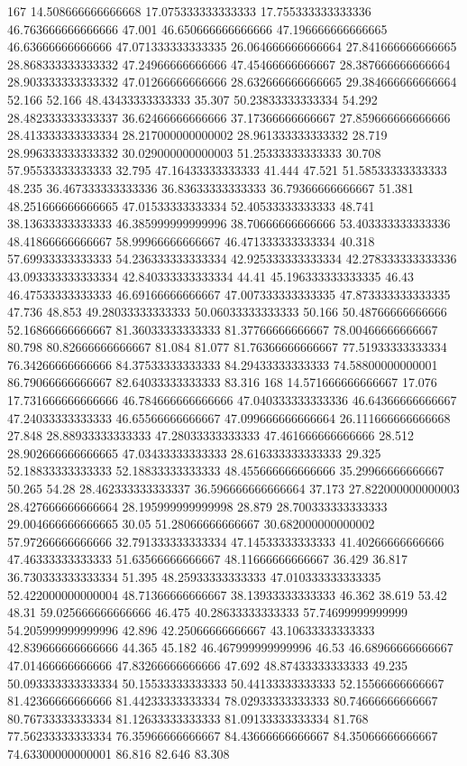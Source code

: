 167 14.508666666666668 17.075333333333333 17.755333333333336 46.763666666666666 47.001 46.650666666666666 47.196666666666665 46.63666666666666 47.071333333333335 26.064666666666664 27.841666666666665 28.868333333333332 47.24966666666666 47.45466666666667 28.387666666666664 28.903333333333332 47.01266666666666 28.632666666666665 29.384666666666664 52.166 52.166 48.43433333333333 35.307 50.23833333333334 54.292 28.482333333333337 36.62466666666666 37.17366666666667 27.859666666666666 28.413333333333334 28.217000000000002 28.961333333333332 28.719 28.996333333333332 30.029000000000003 51.25333333333333 30.708 57.95533333333333 32.795 47.16433333333333 41.444 47.521 51.58533333333333 48.235 36.467333333333336 36.83633333333333 36.79366666666667 51.381 48.251666666666665 47.01533333333334 52.40533333333333 48.741 38.13633333333333 46.385999999999996 38.70666666666666 53.403333333333336 48.41866666666667 58.99966666666667 46.471333333333334 40.318 57.69933333333333 54.236333333333334 42.925333333333334 42.278333333333336 43.093333333333334 42.840333333333334 44.41 45.196333333333335 46.43 46.47533333333333 46.69166666666667 47.007333333333335 47.873333333333335 47.736 48.853 49.28033333333333 50.06033333333333 50.166 50.48766666666666 52.16866666666667 81.36033333333333 81.37766666666667 78.00466666666667 80.798 80.82666666666667 81.084 81.077 81.76366666666667 77.51933333333334 76.34266666666666 84.37533333333333 84.29433333333333 74.58800000000001 86.79066666666667 82.64033333333333 83.316
168 14.571666666666667 17.076 17.731666666666666 46.784666666666666 47.040333333333336 46.64366666666667 47.24033333333333 46.65566666666667 47.099666666666664 26.111666666666668 27.848 28.88933333333333 47.28033333333333 47.461666666666666 28.512 28.902666666666665 47.03433333333333 28.616333333333333 29.325 52.18833333333333 52.18833333333333 48.455666666666666 35.29966666666667 50.265 54.28 28.462333333333337 36.596666666666664 37.173 27.822000000000003 28.427666666666664 28.195999999999998 28.879 28.700333333333333 29.004666666666665 30.05 51.28066666666667 30.682000000000002 57.97266666666666 32.791333333333334 47.14533333333333 41.40266666666666 47.46333333333333 51.63566666666667 48.11666666666667 36.429 36.817 36.730333333333334 51.395 48.25933333333333 47.010333333333335 52.422000000000004 48.71366666666667 38.13933333333333 46.362 38.619 53.42 48.31 59.025666666666666 46.475 40.28633333333333 57.74699999999999 54.205999999999996 42.896 42.25066666666667 43.10633333333333 42.839666666666666 44.365 45.182 46.467999999999996 46.53 46.68966666666667 47.01466666666666 47.83266666666666 47.692 48.87433333333333 49.235 50.093333333333334 50.15533333333333 50.44133333333333 52.15566666666667 81.42366666666666 81.44233333333334 78.02933333333333 80.74666666666667 80.76733333333334 81.12633333333333 81.09133333333334 81.768 77.56233333333334 76.35966666666667 84.43666666666667 84.35066666666667 74.63300000000001 86.816 82.646 83.308
